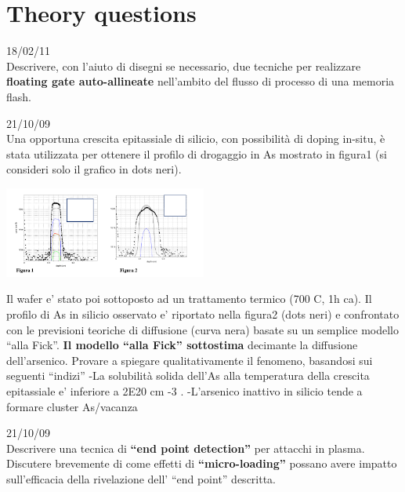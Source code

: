 \chapter{Theory questions}

18/02/11\\

Descrivere, con l’aiuto di disegni se necessario, due tecniche per realizzare {\bf floating gate auto-allineate} nell’ambito del flusso di processo di una memoria flash.\\

\vspace{3mm}

21/10/09\\

Una opportuna crescita epitassiale di silicio, con possibilità di doping in-situ, è stata utilizzata per
ottenere il profilo di drogaggio in As mostrato in figura1 (si consideri solo il grafico in dots neri).

\centering
\includegraphics[width=0.5\textwidth]{examfig.png}\\
\raggedright

Il wafer e’ stato poi sottoposto ad un trattamento termico (700 C, 1h ca). Il profilo di As in silicio
osservato e’ riportato nella figura2 (dots neri) e confrontato con le previsioni teoriche di
diffusione (curva nera) basate su un semplice modello “alla Fick”.
{\bf Il modello “alla Fick” sottostima }decimante la diffusione dell’arsenico.
Provare a spiegare qualitativamente il fenomeno, basandosi sui seguenti “indizi”
-La solubilità solida dell’As alla temperatura della crescita epitassiale e’ inferiore a 2E20 cm -3 .
-L’arsenico inattivo in silicio tende a formare cluster As/vacanza

\vspace{3mm}

21/10/09\\

Descrivere una tecnica di {\bf “end point detection”} per attacchi in plasma.
Discutere brevemente di come effetti di {\bf “micro-loading”} possano avere impatto sull’efficacia
della rivelazione dell’ “end point” descritta.

\vspace{3mm}

